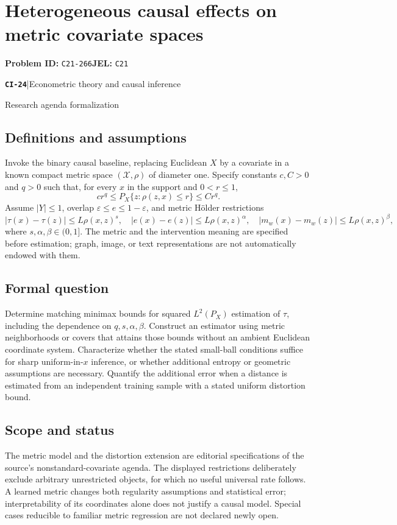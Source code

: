 \documentclass[11pt,a4paper]{article}
\newcommand{\entrymeta}[3]{{\sffamily\small\color{muted}\textbf{\texttt{#1}}\quad|\quad #2\par #3\par}}
\begin{document}
\section*{Heterogeneous causal effects on metric covariate spaces}
\textbf{Problem ID:} \texttt{C21-266}\quad \textbf{JEL:} \texttt{C21}\par
\label{problem:OP-0503}
\label{beyond:CI-24}
\entrymeta{CI-24}{Econometric theory and causal inference}{Research agenda formalization}
\subsection*{Definitions and assumptions}
Invoke the binary causal baseline, replacing Euclidean $X$ by a covariate in a known compact metric space $(\mathcal X,\rho)$ of diameter one. Specify constants $c,C>0$ and $q>0$ such that, for every $x$ in the support and $0<r\leq1$,
\[
 cr^q\leq P_X\{z:\rho(z,x)\leq r\}\leq Cr^q.
\]
Assume $|Y|\leq1$, overlap $\varepsilon\leq e\leq1-\varepsilon$, and metric H\"older restrictions
\[
 |\tau(x)-\tau(z)|\leq L\rho(x,z)^s,
 \quad |e(x)-e(z)|\leq L\rho(x,z)^\alpha,
 \quad |m_w(x)-m_w(z)|\leq L\rho(x,z)^\beta,
\]
where $s,\alpha,\beta\in(0,1]$. The metric and the intervention meaning are specified before estimation; graph, image, or text representations are not automatically endowed with them.
\subsection*{Formal question}
Determine matching minimax bounds for squared $L^2(P_X)$ estimation of $\tau$, including the dependence on $q,s,\alpha,\beta$. Construct an estimator using metric neighborhoods or covers that attains those bounds without an ambient Euclidean coordinate system. Characterize whether the stated small-ball conditions suffice for sharp uniform-in-$x$ inference, or whether additional entropy or geometric assumptions are necessary. Quantify the additional error when a distance is estimated from an independent training sample with a stated uniform distortion bound.
\subsection*{Scope and status}
The metric model and the distortion extension are editorial specifications of the source's nonstandard-covariate agenda. The displayed restrictions deliberately exclude arbitrary unrestricted objects, for which no useful universal rate follows. A learned metric changes both regularity assumptions and statistical error; interpretability of its coordinates alone does not justify a causal model. Special cases reducible to familiar metric regression are not declared newly open.
\end{document}
